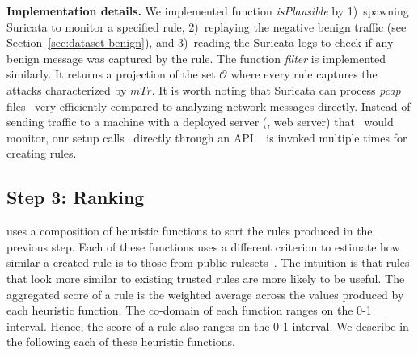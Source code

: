 \documentclass[sigconf,review, anonymous]{acmart}
\begin{document}
\textbf{Implementation details.} We implemented function
\emph{isPlausible} by 1)~spawning Suricata to monitor a specified
rule, 2)~replaying the negative benign traffic (see
Section~\ref{sec:dataset-benign}), and 3)~reading the Suricata logs to
check if any benign message was captured by the rule. The function
\emph{filter} is implemented similarly. It returns a projection of the
set $\mathcal O$ where every rule captures the attacks characterized
by $\mathit{mTr}$. It is worth noting that Suricata can process
\emph{pcap} files~\cite{pcap} very efficiently compared to analyzing
network messages directly. Instead of sending traffic to a machine
with a deployed server (\eg{}, web server) that \suri\ would monitor,
our setup calls \suri\ directly through an API. \suri\ is invoked
multiple times for creating rules.


\subsection{Step 3: Ranking}
\label{sec:ranking}

\tname{} uses a composition of heuristic functions to sort the rules
produced in the previous step. Each of these functions uses a
different criterion to estimate how similar a created rule is to those
from public rulesets~\cite{emerging-threats-open}. The intuition is
that rules that look more similar to existing trusted rules are more
likely to be useful. The aggregated score of a rule is the weighted
average across the values produced by each heuristic function. The
co-domain of each function ranges on the 0-1 interval. Hence, the score
of a rule also ranges on the 0-1 interval. We describe in the
following each of these heuristic functions.

\end{document}
